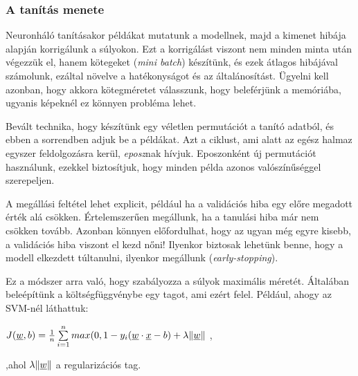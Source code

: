 \subsubsection{A tanítás menete}

Neuronháló tanításakor példákat mutatunk a modellnek, majd a kimenet
hibája alapján korrigálunk a súlyokon. Ezt a korrigálást viszont nem
minden minta után végezzük el, hanem kötegeket (\textit{mini batch}) 
készítünk, és ezek átlagos hibájával számolunk, ezáltal 
növelve a hatékonyságot és az általánosítást. Ügyelni kell azonban, hogy
akkora kötegméretet válasszunk, hogy beleférjünk a memóriába, ugyanis 
képeknél ez könnyen probléma lehet.


Bevált technika, hogy készítünk egy véletlen permutációt a tanító adatból,
és ebben a sorrendben adjuk be a példákat. Azt a ciklust, ami alatt 
az egész halmaz egyszer feldolgozásra kerül, \textit{eposz}nak hívjuk.
Eposzonként új permutációt használunk, ezekkel biztosítjuk, hogy minden
példa azonos valószínűséggel szerepeljen.


A megállási feltétel lehet explicit, például ha a validációs hiba egy előre
megadott érték alá csökken. Értelemszerűen megállunk, ha a tanulási hiba már nem csökken tovább.
Azonban könnyen előfordulhat, hogy az ugyan még egyre kisebb, a validációs hiba
viszont el kezd nőni! Ilyenkor biztosak lehetünk benne, hogy a modell elkezdett
túltanulni, ilyenkor megállunk (\textit{early-stopping}).



Ez a módszer arra való, hogy szabályozza a súlyok maximális méretét. Általában beleépítünk a 
költségfüggvénybe  egy tagot, ami ezért felel. Például, ahogy az SVM-nél láthattuk:

$ J(\underline{w},b)  = \frac{1}{n} \sum\limits_{i=1}^{n} 
max(0, 1 - y_i(\underline{w} \cdot \underline{x} - b) + \lambda \lVert\underline{w}\rVert $ ,

\noindent
,ahol $  \lambda \lVert\underline{w}\rVert $ a regularizációs tag.








